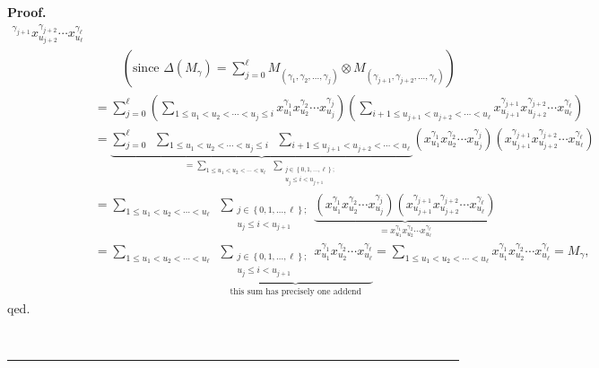 \documentclass
[numbers=enddot,12pt,final,onecolumn,notitlepage,abstracton]{scrartcl}%
\theoremstyle{definition}
\newenvironment{proof}[1][Proof]{\noindent\textbf{#1.} }{\ \rule{0.5em}{0.5em}}
\newenvironment{noncompile}{}{}
\let\sumnonlimits\sum
\renewcommand{\sum}{\sumnonlimits\limits}
\begin{document}
\begin{noncompile}
\begin{proof}
{\begin{align*}
{{{}^{\gamma_{j+1}}x_{u_{j+2}}^{\gamma_{j+2}}\cdots x_{u_{\ell}}^{\gamma_{\ell}}%
}}\\
&  \ \ \ \ \ \ \ \ \ \ \left(  \text{since }\Delta\left(  M_{\gamma}\right)
=\sum_{j=0}^{\ell}M_{\left(  \gamma_{1},\gamma_{2},\ldots,\gamma_{j}\right)
}\otimes M_{\left(  \gamma_{j+1},\gamma_{j+2},\ldots,\gamma_{\ell}\right)
}\right) \\
&  =\sum_{j=0}^{\ell}\left(  \sum_{1\leq u_{1}<u_{2}<\cdots<u_{j}\leq
i}x_{u_{1}}^{\gamma_{1}}x_{u_{2}}^{\gamma_{2}}\cdots x_{u_{j}}^{\gamma_{j}%
}\right)  \left(  \sum_{i+1\leq u_{j+1}<u_{j+2}<\cdots<u_{\ell}}x_{u_{j+1}%
}^{\gamma_{j+1}}x_{u_{j+2}}^{\gamma_{j+2}}\cdots x_{u_{\ell}}^{\gamma_{\ell}%
}\right) \\
&  =\underbrace{\sum_{j=0}^{\ell}\ \ \sum_{1\leq u_{1}<u_{2}<\cdots<u_{j}\leq
i}\ \ \sum_{i+1\leq u_{j+1}<u_{j+2}<\cdots<u_{\ell}}}_{=\sum_{1\leq
u_{1}<u_{2}<\cdots<u_{\ell}}\ \ \sum_{\substack{j\in\left\{  0,1,\ldots
,\ell\right\}  ;\\u_{j}\leq i<u_{j+1}}}}\left(  x_{u_{1}}^{\gamma_{1}}%
x_{u_{2}}^{\gamma_{2}}\cdots x_{u_{j}}^{\gamma_{j}}\right)  \left(
x_{u_{j+1}}^{\gamma_{j+1}}x_{u_{j+2}}^{\gamma_{j+2}}\cdots x_{u_{\ell}%
}^{\gamma_{\ell}}\right) \\
&  =\sum_{1\leq u_{1}<u_{2}<\cdots<u_{\ell}}\ \ \sum_{\substack{j\in\left\{
0,1,\ldots,\ell\right\}  ;\\u_{j}\leq i<u_{j+1}}}\underbrace{\left(  x_{u_{1}%
}^{\gamma_{1}}x_{u_{2}}^{\gamma_{2}}\cdots x_{u_{j}}^{\gamma_{j}}\right)
\left(  x_{u_{j+1}}^{\gamma_{j+1}}x_{u_{j+2}}^{\gamma_{j+2}}\cdots x_{u_{\ell
}}^{\gamma_{\ell}}\right)  }_{=x_{u_{1}}^{\gamma_{1}}x_{u_{2}}^{\gamma_{2}%
}\cdots x_{u_{\ell}}^{\gamma_{\ell}}}\\
&  =\sum_{1\leq u_{1}<u_{2}<\cdots<u_{\ell}}\ \ \underbrace{\sum
_{\substack{j\in\left\{  0,1,\ldots,\ell\right\}  ;\\u_{j}\leq i<u_{j+1}%
}}x_{u_{1}}^{\gamma_{1}}x_{u_{2}}^{\gamma_{2}}\cdots x_{u_{\ell}}%
^{\gamma_{\ell}}}_{\text{this sum has precisely one addend}}=\sum_{1\leq
u_{1}<u_{2}<\cdots<u_{\ell}}x_{u_{1}}^{\gamma_{1}}x_{u_{2}}^{\gamma_{2}}\cdots
x_{u_{\ell}}^{\gamma_{\ell}}=M_{\gamma},
\end{align*}
qed.}


\end{proof}
\end{noncompile}
\end{document}
